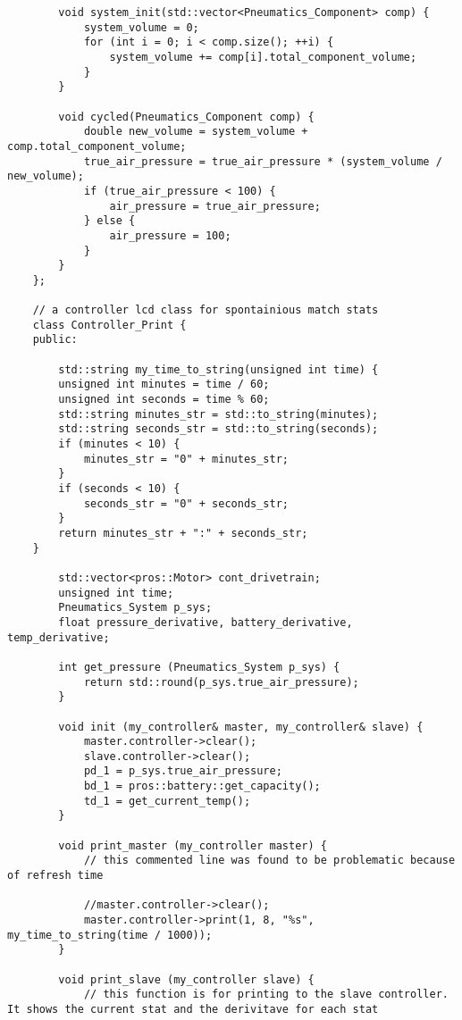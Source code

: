 \begin{verbatim}
        void system_init(std::vector<Pneumatics_Component> comp) {
            system_volume = 0;
            for (int i = 0; i < comp.size(); ++i) {
                system_volume += comp[i].total_component_volume;
            }
        }

        void cycled(Pneumatics_Component comp) {
            double new_volume = system_volume + comp.total_component_volume;
            true_air_pressure = true_air_pressure * (system_volume / new_volume);
            if (true_air_pressure < 100) {
                air_pressure = true_air_pressure;
            } else {
                air_pressure = 100;
            }
        }
    };

    // a controller lcd class for spontainious match stats
    class Controller_Print {
    public:

        std::string my_time_to_string(unsigned int time) {
        unsigned int minutes = time / 60;
        unsigned int seconds = time % 60;
        std::string minutes_str = std::to_string(minutes);
        std::string seconds_str = std::to_string(seconds);
        if (minutes < 10) {
            minutes_str = "0" + minutes_str;
        }
        if (seconds < 10) {
            seconds_str = "0" + seconds_str;
        }
        return minutes_str + ":" + seconds_str;
    }
    
        std::vector<pros::Motor> cont_drivetrain;
        unsigned int time;
        Pneumatics_System p_sys;
        float pressure_derivative, battery_derivative, temp_derivative;

        int get_pressure (Pneumatics_System p_sys) {
            return std::round(p_sys.true_air_pressure);
        }

        void init (my_controller& master, my_controller& slave) {
            master.controller->clear();
            slave.controller->clear();
            pd_1 = p_sys.true_air_pressure;
            bd_1 = pros::battery::get_capacity();
            td_1 = get_current_temp();
        }

        void print_master (my_controller master) {
            // this commented line was found to be problematic because of refresh time

            //master.controller->clear();
            master.controller->print(1, 8, "%s", my_time_to_string(time / 1000));
        }

        void print_slave (my_controller slave) {
            // this function is for printing to the slave controller. It shows the current stat and the derivitave for each stat


\end{verbatim}
